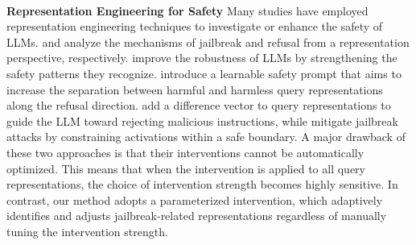 \vspace{0.2\baselineskip}
\\ \textbf{Representation Engineering for Safety}\quad     %
Many studies have employed representation engineering techniques \cite{zou2023RepE} to investigate or enhance the safety of LLMs. \citet{zhou2024explain} and \citet{arditi2024refusal} analyze the mechanisms of jailbreak and refusal from a representation perspective, respectively. 
\citet{li2025revisiting} improve the robustness of LLMs by strengthening the safety patterns they recognize.
\citet{zheng2024DRO} introduce a learnable safety prompt that aims to increase the separation between harmful and harmless query representations along the refusal direction. 
\citet{shen2025JA} add a difference vector to query representations to guide the LLM toward rejecting malicious instructions, while \citet{gao2024shaping} mitigate jailbreak attacks by constraining activations within a safe boundary. 
A major drawback of these two approaches is that their interventions cannot be automatically optimized. This means that when the intervention is applied to all query representations, the choice of intervention strength becomes highly sensitive.   
In contrast, our method adopts a parameterized intervention, which adaptively identifies and adjusts jailbreak-related representations regardless of manually tuning the intervention strength.